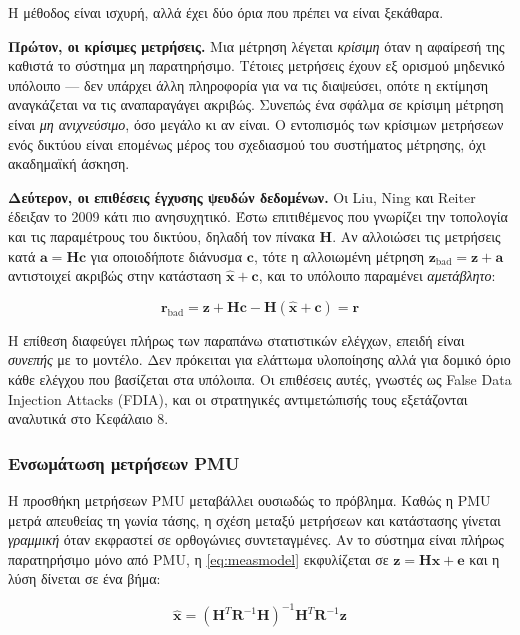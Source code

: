 Η μέθοδος είναι ισχυρή, αλλά έχει δύο όρια που πρέπει να είναι ξεκάθαρα.

\textbf{Πρώτον, οι κρίσιμες μετρήσεις.} Μια μέτρηση λέγεται \emph{κρίσιμη} όταν η αφαίρεσή
της καθιστά το σύστημα μη παρατηρήσιμο. Τέτοιες μετρήσεις έχουν εξ ορισμού μηδενικό
υπόλοιπο — δεν υπάρχει άλλη πληροφορία για να τις διαψεύσει, οπότε η εκτίμηση αναγκάζεται
να τις αναπαραγάγει ακριβώς. Συνεπώς ένα σφάλμα σε κρίσιμη μέτρηση είναι \emph{μη
ανιχνεύσιμο}, όσο μεγάλο κι αν είναι. Ο εντοπισμός των κρίσιμων μετρήσεων ενός δικτύου
είναι επομένως μέρος του σχεδιασμού του συστήματος μέτρησης, όχι ακαδημαϊκή άσκηση.

\textbf{Δεύτερον, οι επιθέσεις έγχυσης ψευδών δεδομένων.} Οι Liu, Ning και Reiter έδειξαν
το 2009 κάτι πιο ανησυχητικό. Έστω επιτιθέμενος που γνωρίζει την τοπολογία και τις
παραμέτρους του δικτύου, δηλαδή τον πίνακα $\mathbf{H}$. Αν αλλοιώσει τις μετρήσεις κατά
$\mathbf{a} = \mathbf{H}\mathbf{c}$ για οποιοδήποτε διάνυσμα $\mathbf{c}$, τότε η
αλλοιωμένη μέτρηση $\mathbf{z}_{\text{bad}} = \mathbf{z} + \mathbf{a}$ αντιστοιχεί ακριβώς
στην κατάσταση $\hat{\mathbf{x}} + \mathbf{c}$, και το υπόλοιπο παραμένει \emph{αμετάβλητο}:

\begin{equation}
\mathbf{r}_{\text{bad}} = \mathbf{z} + \mathbf{H}\mathbf{c}
        - \mathbf{H}(\hat{\mathbf{x}} + \mathbf{c}) = \mathbf{r}
\label{eq:fdia}
\end{equation}

Η επίθεση διαφεύγει πλήρως των παραπάνω στατιστικών ελέγχων, επειδή είναι \emph{συνεπής} με
το μοντέλο. Δεν πρόκειται για ελάττωμα υλοποίησης αλλά για δομικό όριο κάθε ελέγχου που
βασίζεται στα υπόλοιπα. Οι επιθέσεις αυτές, γνωστές ως False Data Injection Attacks (FDIA),
και οι στρατηγικές αντιμετώπισής τους εξετάζονται αναλυτικά στο Κεφάλαιο 8.

\subsubsection*{Ενσωμάτωση μετρήσεων PMU}

Η προσθήκη μετρήσεων PMU μεταβάλλει ουσιωδώς το πρόβλημα. Καθώς η PMU μετρά απευθείας τη
γωνία τάσης, η σχέση μεταξύ μετρήσεων και κατάστασης γίνεται \emph{γραμμική} όταν εκφραστεί
σε ορθογώνιες συντεταγμένες. Αν το σύστημα είναι πλήρως παρατηρήσιμο μόνο από PMU, η
\eqref{eq:measmodel} εκφυλίζεται σε $\mathbf{z} = \mathbf{H}\mathbf{x} + \mathbf{e}$ και η
λύση δίνεται σε ένα βήμα:

\begin{equation}
\hat{\mathbf{x}} = \left(\mathbf{H}^{T}\mathbf{R}^{-1}\mathbf{H}\right)^{-1}
                    \mathbf{H}^{T}\mathbf{R}^{-1}\mathbf{z}
\label{eq:linse}
\end{equation}

